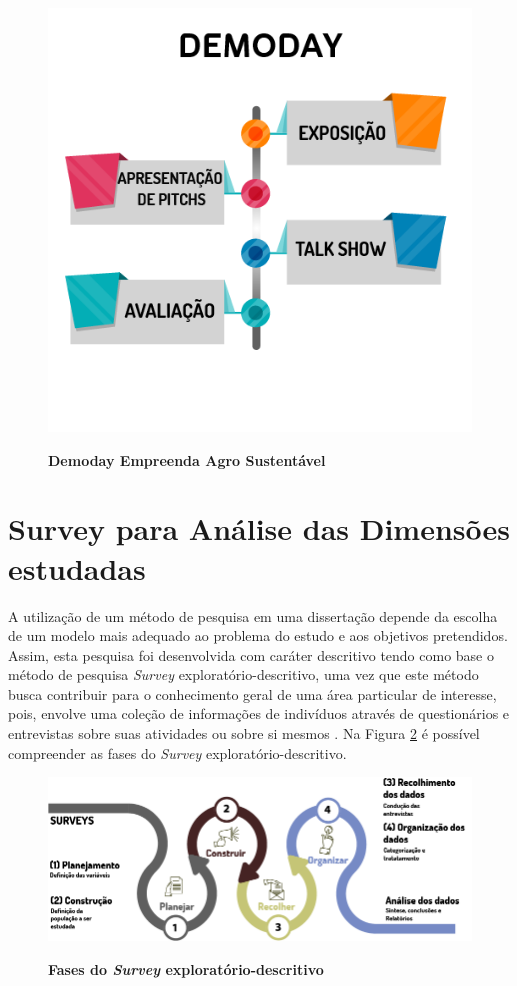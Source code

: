 \begin{figure}[H]
\centering
\caption{\textbf{Demoday Empreenda Agro Sustentável}}
\includegraphics[scale=0.5]{Imagens/workshop-04.png}
\label{figura_33}
\end{figure}

\section{Survey para Análise das Dimensões estudadas}

A utilização de um método de pesquisa em uma dissertação depende da escolha de um modelo mais adequado ao problema do estudo e aos objetivos pretendidos. Assim, esta pesquisa foi desenvolvida com caráter descritivo tendo como base o método de pesquisa \textit{Survey} exploratório-descritivo, uma vez que este método busca contribuir para o conhecimento geral de uma área particular de interesse, pois, envolve uma coleção de informações de indivíduos através de questionários e entrevistas sobre suas atividades ou sobre si mesmos  \cite{forza_survey_2002}. Na Figura \ref{figura_8} é possível compreender as fases do \textit{Survey} exploratório-descritivo.


\begin{figure}[H]
\centering
\caption{\textbf{Fases do \textit{Survey} exploratório-descritivo}}
\includegraphics[scale=0.5]{Imagens/survey.png}
\label{figura_8}
\end{figure}

